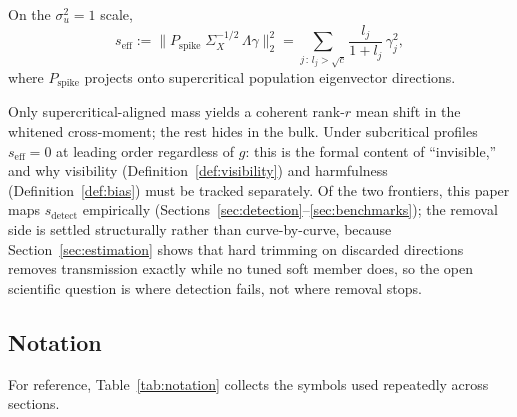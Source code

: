 \begin{definition}
\label{def:seff}
On the $\sigma_u^2 = 1$ scale,
\[
s_{\mathrm{eff}} := \bigl\| P_{\mathrm{spike}}\;\Sigma_X^{-1/2}\,\Lambda\gamma \bigr\|_2^2
= \sum_{j\,:\,l_j > \sqrt{c}} \frac{l_j}{1 + l_j}\,\gamma_j^2 ,
\]
where $P_{\mathrm{spike}}$ projects onto supercritical population eigenvector directions.
\end{definition}

Only supercritical-aligned mass yields a coherent rank-$r$ mean shift in the whitened cross-moment; the rest hides in the bulk. Under subcritical profiles $s_{\mathrm{eff}} = 0$ at leading order regardless of $g$: this is the formal content of ``invisible,'' and why visibility (Definition~\ref{def:visibility}) and harmfulness (Definition~\ref{def:bias}) must be tracked separately. Of the two frontiers, this paper maps $s_{\mathrm{detect}}$ empirically (Sections~\ref{sec:detection}--\ref{sec:benchmarks}); the removal side is settled structurally rather than curve-by-curve, because Section~\ref{sec:estimation} shows that hard trimming on discarded directions removes transmission exactly while no tuned soft member does, so the open scientific question is where detection fails, not where removal stops.

\subsection{Notation}
\label{subsec:notation}

For reference, Table~\ref{tab:notation} collects the symbols used repeatedly across sections.

